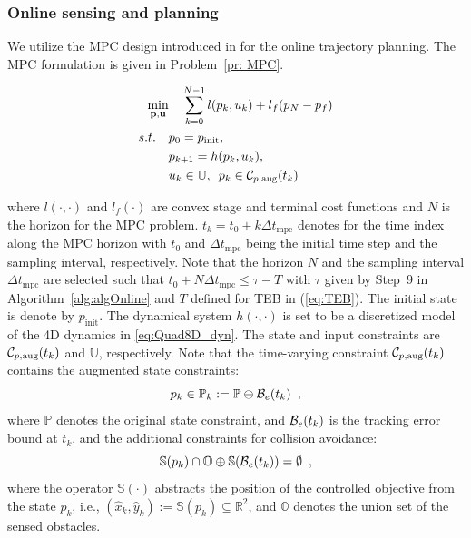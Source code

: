 \subsubsection{Online sensing and planning}
%
We utilize the MPC design introduced in \cite{Zhang2017} for the online trajectory planning. The MPC formulation is given in Problem~\ref{pr: MPC}.
%
\begin{problem}\label{pr: MPC}
\begin{align*}
\min_{\mathbf{p},\mathbf{u}}  & \quad \sum^{N-1}_{k=0} l(p_k,u_k) + l_f(p_N-p_f)  \\
s.t. \quad & p_0 = p_{\text{init}},\\
&p_{k+1} = h(p_k,u_k),\\
& u_k \in \mathbb{U},\enspace p_k \in \mathcal C_{p,\text{aug}}(t_k) 
\end{align*}
\end{problem}
%
where $l(\cdot,\cdot)$ and $l_f(\cdot)$ are convex stage and terminal cost functions and $N$ is the horizon for the MPC problem. $t_k = t_0 + k \Delta t_{\text{mpc}}$ denotes for the time index along the MPC horizon with $t_0$ and $\Delta t_{\text{mpc}}$ being the initial time step and the sampling interval, respectively. Note that the horizon $N$ and the sampling interval $\Delta t_{\text{mpc}}$ are selected such that $t_0 + N \Delta t_{\text{mpc}}\leq \tau - T$ with $\tau$ given by Step~9 in Algorithm~\ref{alg:algOnline} and $T$ defined for TEB in (\ref{eq:TEB}). The initial state is denote by $p_{\text{init}}$. The dynamical system $h(\cdot,\cdot)$ is set to be a discretized model of the 4D dynamics in \eqref{eq:Quad8D_dyn}. The state and input constraints are $\mathcal C_{p,\text{aug}}(t_k)$ and $\mathbb{U}$, respectively. Note that the time-varying constraint $\mathcal C_{p,\text{aug}}(t_k)$ contains the augmented state constraints:
%
\begin{equation}
p_k \in \mathbb{P}_k :=\mathbb{P}\ominus\mathcal B_e(t_k) \enspace ,
\end{equation}
%
where $\mathbb{P}$ denotes the original state constraint, and $\mathcal B_e(t_k)$ is the tracking error bound at $t_k$, and the additional constraints for collision avoidance:
%
\begin{equation}
\mathbb{S}(p_k)\cap\mathbb{O}\oplus\mathbb{S}(\mathcal B_e(t_k)) = \emptyset \enspace ,
\end{equation}
%
where the operator $\mathbb{S}(\cdot)$ abstracts the position of the controlled objective from the state $p_k$, i.e., $(\hat x_k,\hat y_k) := \mathbb{S}(p_k)\subseteq \mathbb{R}^{2}$, and $\mathbb{O}$ denotes the union set of the sensed obstacles.
